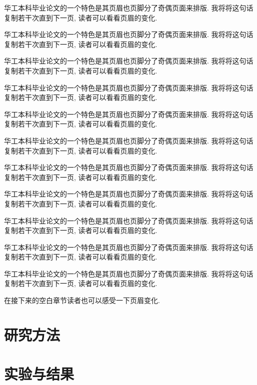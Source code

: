 \documentclass{scutbthesis}
\begin{document}
华工本科毕业论文的一个特色是其页眉也页脚分了奇偶页面来排版. 我将将这句话复制若干次直到下一页, 读者可以看看页眉的变化.

华工本科毕业论文的一个特色是其页眉也页脚分了奇偶页面来排版. 我将将这句话复制若干次直到下一页, 读者可以看看页眉的变化.

华工本科毕业论文的一个特色是其页眉也页脚分了奇偶页面来排版. 我将将这句话复制若干次直到下一页, 读者可以看看页眉的变化.

华工本科毕业论文的一个特色是其页眉也页脚分了奇偶页面来排版. 我将将这句话复制若干次直到下一页, 读者可以看看页眉的变化.

华工本科毕业论文的一个特色是其页眉也页脚分了奇偶页面来排版. 我将将这句话复制若干次直到下一页, 读者可以看看页眉的变化.

华工本科毕业论文的一个特色是其页眉也页脚分了奇偶页面来排版. 我将将这句话复制若干次直到下一页, 读者可以看看页眉的变化.

华工本科毕业论文的一个特色是其页眉也页脚分了奇偶页面来排版. 我将将这句话复制若干次直到下一页, 读者可以看看页眉的变化.

华工本科毕业论文的一个特色是其页眉也页脚分了奇偶页面来排版. 我将将这句话复制若干次直到下一页, 读者可以看看页眉的变化.

华工本科毕业论文的一个特色是其页眉也页脚分了奇偶页面来排版. 我将将这句话复制若干次直到下一页, 读者可以看看页眉的变化.

华工本科毕业论文的一个特色是其页眉也页脚分了奇偶页面来排版. 我将将这句话复制若干次直到下一页, 读者可以看看页眉的变化.

华工本科毕业论文的一个特色是其页眉也页脚分了奇偶页面来排版. 我将将这句话复制若干次直到下一页, 读者可以看看页眉的变化.

在接下来的空白章节读者也可以感受一下页眉变化.

\pagebreak[4]

\section{研究方法}

\pagebreak[4]

\section{实验与结果}
\end{document}
